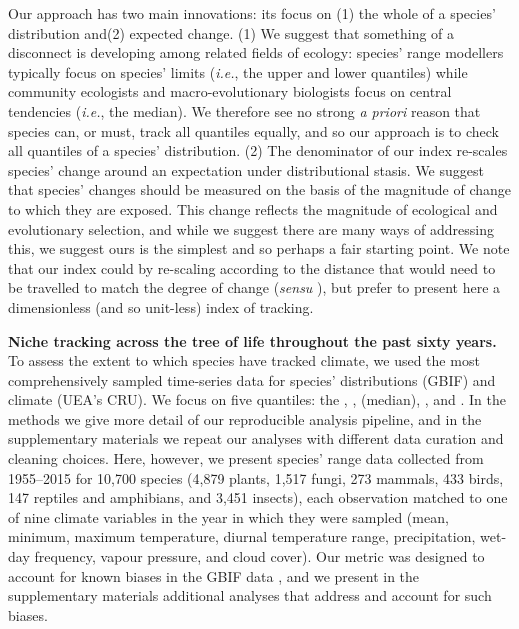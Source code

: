\documentclass[12pt]{report}
\begin{document}
Our approach has two main innovations: its focus on (1) the whole of a
species' distribution and(2) expected change. (1) We suggest that
something of a disconnect is developing among related fields of
ecology: species' range modellers typically focus on species'
limits\supercite{Sexton2009} (\emph{i.e.}, the upper and lower
quantiles) while community ecologists \supercite{Tilman2004} and
macro-evolutionary \supercite{Zanne2018} biologists focus on central
tendencies (\emph{i.e.}, the median). We therefore see no strong
\emph{a priori} reason that species can, or must, track all quantiles
equally, and so our approach is to check all quantiles of a species'
distribution. (2) The denominator of our index re-scales species'
change around an expectation under distributional stasis. We suggest
that species' changes should be measured on the basis of the magnitude
of change to which they are exposed. This change reflects the
magnitude of ecological and evolutionary selection, and while we
suggest there are many ways of addressing this, we suggest ours is the
simplest and so perhaps a fair starting point. We note that our index
could by re-scaling according to the distance that would need to be
travelled to match the degree of change (\emph{sensu}
\citeauthor{Loarie2009}\supercite{Loarie2009}), but prefer to present
here a dimensionless (and so unit-less) index of tracking.

\textbf{Niche tracking across the tree of life throughout the past
  sixty years.} To assess the extent to which species have tracked
climate, we used the most comprehensively sampled time-series data for
species' distributions (GBIF\supercite{url_gbif}) and climate (UEA's
CRU\supercite{Harris2014}). We focus on five quantiles: the ,
,  (median), , and . In the methods we
give more detail of our reproducible analysis pipeline, and in the
supplementary materials we repeat our analyses with different data
curation and cleaning choices. Here, however, we present species'
range data collected from 1955--2015 for 10,700 species (4,879 plants,
1,517 fungi, 273 mammals, 433 birds, 147 reptiles and amphibians, and
3,451 insects), each observation matched to one of nine climate
variables in the year in which they were sampled (mean, minimum,
maximum temperature, diurnal temperature range, precipitation, wet-day
frequency, vapour pressure, and cloud cover). Our metric was designed
to account for known biases in the GBIF data \supercite{Beck2014}, and
we present in the supplementary materials additional analyses that
address and account for such biases.
\end{document}
